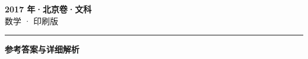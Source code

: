 \documentclass[zihao=5, a4paper]{ctexart}
\begin{document}
\begin{center}
  {\Large\bfseries 2017 年·北京卷·文科}\\[4pt]
  {\large 数学 · 印刷版}
\end{center}
\medskip
{}

\par\bigskip\hrule\bigskip
{}
\begin{center}{\large\bfseries 参考答案与详细解析}\end{center}
\smallskip

\end{document}
